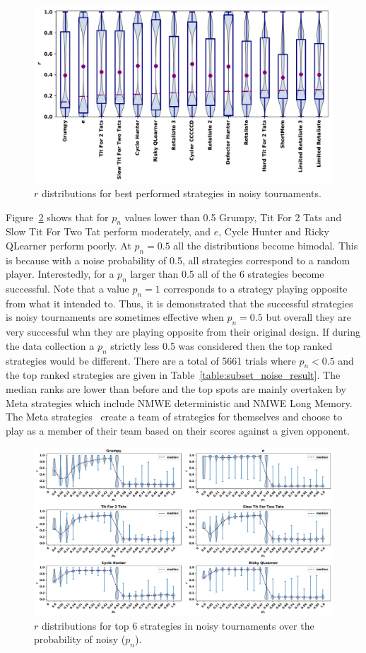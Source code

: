 \documentclass{article}
\begin{document}
\begin{figure}[!htbp]
    \centering
    \includegraphics[width=.7\textwidth]{../images/performance_noise.pdf}
    \caption{\(r\) distributions for best performed strategies in noisy tournaments.}
    \label{fig:noisy_results}
\end{figure}

Figure~\ref{fig:effect_of_noise} shows that for \(p_n\) values lower than 0.5
Grumpy, Tit For 2 Tats and Slow Tit For Two Tat perform moderately, and \(e\),
Cycle Hunter and Ricky QLearner perform poorly. At \(p_n=0.5\) all the
distributions become bimodal. This is because with a noise probability of 0.5,
all strategies correspond to a random player. Interestedly, for a \(p_n\) larger
than 0.5 all of the 6 strategies become successful. Note that a value \(p_n=1\)
corresponds to a strategy playing opposite from what it intended to. Thus, it is
demonstrated that the successful strategies is noisy tournaments are sometimes
effective when \(p_n=0.5\) but overall they are very successful whn they are
playing opposite from their original design. If during the data collection a
\(p_n\) strictly less 0.5 was considered then the top ranked strategies would be
different. There are a total of 5661 trials where \(p_n<0.5\) and the top ranked
strategies are given in Table~\ref{table:subset_noise_result}. The median ranks
are lower than before and the top spots are mainly overtaken by Meta strategies
which include NMWE deterministic and NMWE Long Memory. The Meta
strategies~\cite{axelrodproject} create a team of strategies for themselves and
choose to play as a member of their team based on their scores against a given
opponent.

\begin{figure}[!htbp]
    \centering
    \includegraphics[width=\textwidth]{../images/noise_effect.pdf}
    \caption{\(r\) distributions for top 6 strategies in noisy tournaments over
    the probability of noisy ($p_n$).}
    \label{fig:effect_of_noise}
\end{figure}
\end{document}
